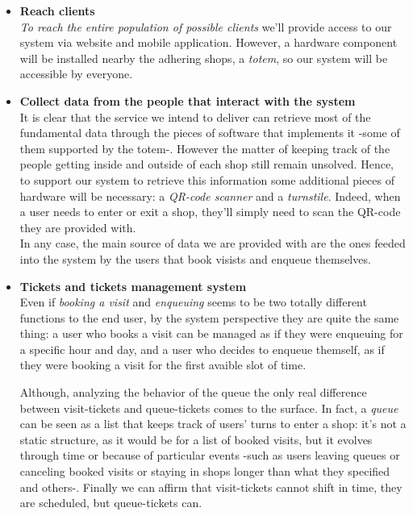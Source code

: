 \begin{itemize}[topsep=0pt]
    \item \textbf{Reach clients}\\
    \textit{To reach the entire population of possible clients} we'll provide access to our system via website and mobile application. However, a hardware component will be installed nearby the adhering shops, a \textit{totem}, so our system will be accessible by everyone.\\

    \item \textbf{Collect data from the people that interact with the system}\\
    It is clear that the service we intend to deliver can retrieve most of the fundamental data through the pieces of software that implements it -some of them supported by the totem-. However the matter of keeping track of the people getting inside and outside of each shop still remain unsolved. Hence, to support our system to retrieve this information some additional pieces of hardware will be necessary: a \textit{QR-code scanner} and a \textit{turnstile}. Indeed, when a user needs to enter or exit a shop, they'll simply need to scan the QR-code they are provided with.\\
    In any case, the main source of data we are provided with are the ones feeded into the system by the users that book visists and enqueue themselves.
    
    \item \textbf{Tickets and tickets management system}\\

    Even if \textit{booking a visit} and \textit{enqueuing} seems to be two totally different functions to the end user, by the system perspective they are quite the same thing: a user who books a visit can be managed as if they were enqueuing for a specific hour and day, and a user who decides to enqueue themself, as if they were booking a visit for the first avaible slot of time. 

    Although, analyzing the behavior of the queue the only real difference between visit-tickets and queue-tickets comes to the surface. In fact, a \textit{queue} can be seen as a list that keeps track of users' turns to enter a shop: it's not a static structure, as it would be for a list of booked visits, but it evolves through time or because of particular events -such as users leaving queues or canceling booked visits or staying in shops longer than what they specified and others-. 
    Finally we can affirm that visit-tickets cannot shift in time, they are scheduled, but queue-tickets can.
    

\end{itemize}
